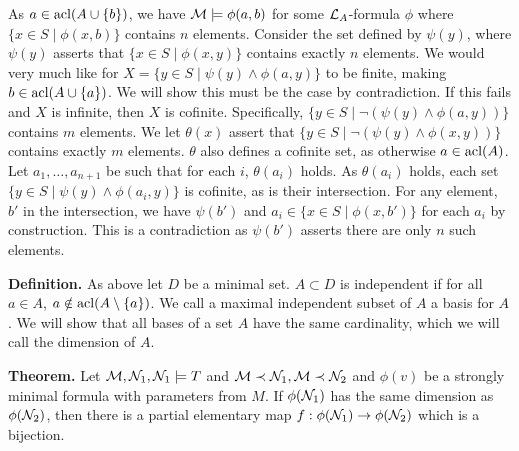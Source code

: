 As \(a \in \text{acl}(A \cup \{b\})\), we have \(\mathcal{M} \models \phi(a, b)\) for some \(\mathcal{L}_A\)-formula 
\(\phi\) where \(\{x \in S \mid \phi(x, b)\}\) contains \(n\) elements. 
Consider the set defined by \(\psi(y)\), where \(\psi(y)\) asserts that \(\{x \in S \mid \phi(x, y)\}\) contains exactly \(n\) elements. %
We would very much like for \(X = \{y \in S \mid \psi(y) \land \phi(a, y)\}\) to be finite, making \(b \in \text{acl}(A \cup \{a\})\). 
We will show this must be the case by contradiction.
If this fails and \(X\) is infinite, then \(X\) is cofinite. 
Specifically, \(\{y \in S \mid \neg(\psi(y) \land \phi(a, y))\}\) contains \(m\) elements.  
We let \(\theta(x)\) assert that \(\{y \in S \mid \neg(\psi(y) \land \phi(x, y))\}\) contains exactly \(m\) elements.
\(\theta\) also defines a cofinite set, as otherwise \(a \in \text{acl}(A)\).   
Let \(a_1, \ldots, a_{n+1}\) be such that for each \(i\), \(\theta(a_i)\) holds.
As \(\theta(a_i)\) holds, each set \(\{y \in S \mid \psi(y) \land \phi(a_i, y)\}\) is cofinite, as is their intersection. 
For any element, \(b'\) in the intersection, we have \(\psi(b')\) and \(a_i \in \{x \in S \mid \phi(x, b')\}\) for each \(a_i\) by construction.
This is a contradiction as \(\psi(b')\) asserts there are only \(n\) such elements.  

\textbf{Definition.} As above let \(D\) be a minimal set. \(A \subset D\) is independent if for all \(a \in A\), \(a \notin \text{acl}(A \setminus \{a\})\). 
We call a maximal independent subset of \(A\) a basis for \(A\). 
We will show that all bases of a set \(A\)  have the same cardinality, which we will call the dimension of \(A\).


\textbf{Theorem.} Let \(\mathcal{M}, \mathcal{N}_1, \mathcal{N}_1 \models T\) and \(\mathcal{M} \prec \mathcal{N}_1, \mathcal{M} \prec \mathcal{N}_2\) and \(\phi(v)\) be a strongly minimal formula with parameters from \(M\).
If \(\phi(\mathcal{N}_1)\) has the same dimension as \(\phi(\mathcal{N}_2)\), then there is a partial elementary map \(f: \phi(\mathcal{N}_1) \to \phi(\mathcal{N}_2)\) which is a bijection. 

